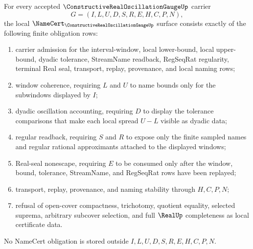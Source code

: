 \begin{theorem}
\label{thm:constructive-real-oscillation-gauge-namecert-obligations}
For every accepted $\ConstructiveRealOscillationGaugeUp$ carrier
$$
G=(I,L,U,D,S,R,E,H,C,P,N),
$$
the local $\NameCert_{\ConstructiveRealOscillationGaugeUp}$ surface consists exactly of the following finite obligation rows:
\begin{enumerate}
\item carrier admission for the interval-window, local lower-bound, local upper-bound, dyadic tolerance, StreamName readback, RegSeqRat regularity, terminal Real seal, transport, replay, provenance, and local naming rows;
\item window coherence, requiring $L$ and $U$ to name bounds only for the subwindows displayed by $I$;
\item dyadic oscillation accounting, requiring $D$ to display the tolerance comparisons that make each local spread $U-L$ visible as dyadic data;
\item regular readback, requiring $S$ and $R$ to expose only the finite sampled names and regular rational approximants attached to the displayed windows;
\item Real-seal nonescape, requiring $E$ to be consumed only after the window, bound, tolerance, StreamName, and RegSeqRat rows have been replayed;
\item transport, replay, provenance, and naming stability through $H,C,P,N$;
\item refusal of open-cover compactness, trichotomy, quotient equality, selected suprema, arbitrary subcover selection, and full $\RealUp$ completeness as local certificate data.
\end{enumerate}
No NameCert obligation is stored outside $I,L,U,D,S,R,E,H,C,P,N$.
\end{theorem}
